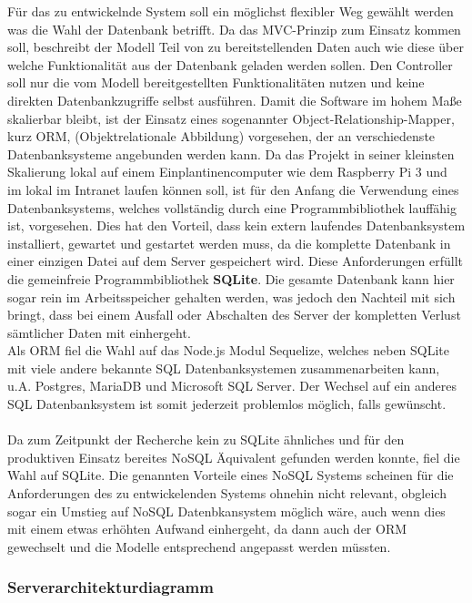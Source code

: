 Für das zu entwickelnde System soll ein möglichst flexibler Weg gewählt werden was die Wahl der Datenbank betrifft. Da das MVC-Prinzip zum Einsatz kommen soll, beschreibt der Modell Teil von zu bereitstellenden Daten auch wie diese über welche Funktionalität aus der Datenbank geladen werden sollen. Den Controller soll nur die vom Modell bereitgestellten Funktionalitäten nutzen und keine direkten Datenbankzugriffe selbst ausführen. Damit die Software im hohem Maße skalierbar bleibt, ist der Einsatz eines sogenannter Object-Relationship-Mapper, kurz ORM, (Objektrelationale Abbildung) vorgesehen, der an verschiedenste Datenbanksysteme angebunden werden kann. Da das Projekt in seiner kleinsten Skalierung lokal auf einem Einplantinencomputer wie dem Raspberry Pi 3 und im lokal im Intranet laufen können soll, ist für den Anfang die Verwendung eines Datenbanksystems, welches vollständig durch eine Programmbibliothek lauffähig ist, vorgesehen. Dies hat den Vorteil, dass kein extern laufendes Datenbanksystem installiert, gewartet und gestartet werden muss, da die komplette Datenbank in einer einzigen Datei auf dem Server gespeichert wird. Diese Anforderungen erfüllt die gemeinfreie Programmbibliothek \textbf{SQLite}. Die gesamte Datenbank kann hier sogar rein im Arbeitsspeicher gehalten werden, was jedoch den Nachteil mit sich bringt, dass bei einem Ausfall oder Abschalten des Server der kompletten Verlust sämtlicher Daten mit einhergeht. 
\\ Als ORM fiel die Wahl auf das Node.js Modul Sequelize, welches neben SQLite mit viele andere bekannte SQL Datenbanksystemen zusammenarbeiten kann, u.A. Postgres, MariaDB und Microsoft SQL Server. Der Wechsel auf ein anderes SQL Datenbanksystem ist somit jederzeit problemlos möglich, falls gewünscht. \\ \\  

Da zum Zeitpunkt der Recherche kein zu SQLite ähnliches und für den produktiven Einsatz bereites NoSQL Äquivalent gefunden werden konnte, fiel die Wahl auf SQLite. Die genannten Vorteile eines NoSQL Systems scheinen für die Anforderungen des zu entwickelenden Systems ohnehin nicht relevant, obgleich sogar ein Umstieg auf NoSQL Datenbkansystem möglich wäre, auch wenn dies mit einem etwas erhöhten Aufwand einhergeht, da dann auch der ORM gewechselt und die Modelle entsprechend angepasst werden müssten.  

\subsubsection{Serverarchitekturdiagramm}\label{sec:serverarchitekt}

